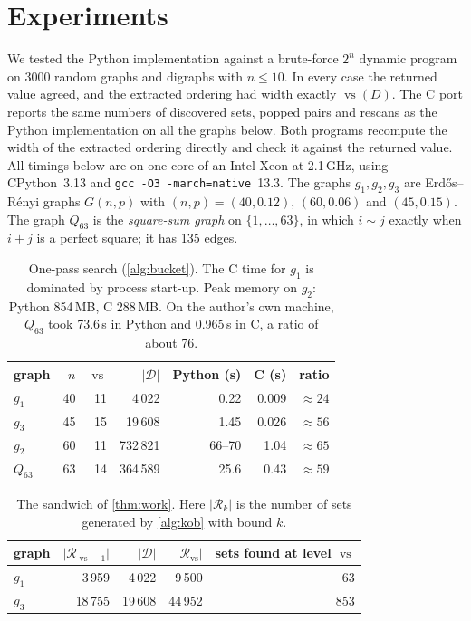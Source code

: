 \documentclass[11pt]{article}
\theoremstyle{definition}
\newcommand{\vs}{\operatorname{vs}}
\newcommand{\Rel}{\mathcal{R}}
\newcommand{\set}[1]{\{#1\}}
\begin{document}
\section{Experiments}\label{sec:exp}

We tested the Python implementation against a brute-force $2^n$ dynamic
program on 3000 random graphs and digraphs with $n\le 10$. In every case the
returned value agreed, and the extracted ordering had width exactly
$\vs(D)$. The C port reports the same numbers of discovered sets, popped
pairs and rescans as the Python implementation on all the graphs below. Both
programs recompute the width of the extracted ordering directly and check
it against the returned value. All timings below are on one core of an
Intel Xeon at 2.1\,GHz, using CPython~3.13 and \texttt{gcc -O3
-march=native}~13.3. The graphs $g_1,g_2,g_3$ are Erd\H{o}s--R\'enyi graphs
$G(n,p)$ with $(n,p)=(40,0.12)$, $(60,0.06)$ and $(45,0.15)$. The graph
$Q_{63}$ is the \emph{square-sum graph} on $\set{1,\dots,63}$, in which
$i\sim j$ exactly when $i+j$ is a perfect square; it has 135 edges.

\begin{table}[ht]
\centering
\begin{tabular}{lrrrrrr}
\toprule
graph & $n$ & $\vs$ & $|\mathcal{D}|$ & Python (s) & C (s) & ratio\\
\midrule
$g_1$ & 40 & 11 & 4\,022 & 0.22 & 0.009 & $\approx 24$\\
$g_3$ & 45 & 15 & 19\,608 & 1.45 & 0.026 & $\approx 56$\\
$g_2$ & 60 & 11 & 732\,821 & 66--70 & 1.04 & $\approx 65$\\
$Q_{63}$ & 63 & 14 & 364\,589 & 25.6 & 0.43 & $\approx 59$\\
\bottomrule
\end{tabular}
\caption{One-pass search (\cref{alg:bucket}). The C time for $g_1$ is
dominated by process start-up. Peak memory on $g_2$: Python 854\,MB, C
288\,MB. On the author's own machine, $Q_{63}$ took 73.6\,s in Python and
0.965\,s in C, a ratio of about 76.}\label{tab:time}
\end{table}

\begin{table}[ht]
\centering
\begin{tabular}{lrrrr}
\toprule
graph & $|\Rel_{\vs-1}|$ & $|\mathcal{D}|$ & $|\Rel_{\vs}|$ & sets found at level $\vs$\\
\midrule
$g_1$ & 3\,959 & 4\,022 & 9\,500 & 63\\
$g_3$ & 18\,755 & 19\,608 & 44\,952 & 853\\
\bottomrule
\end{tabular}
\caption{The sandwich of \cref{thm:work}. Here $|\Rel_k|$ is the number of
sets generated by \cref{alg:kob} with bound $k$.}\label{tab:sandwich}
\end{table}
\end{document}
